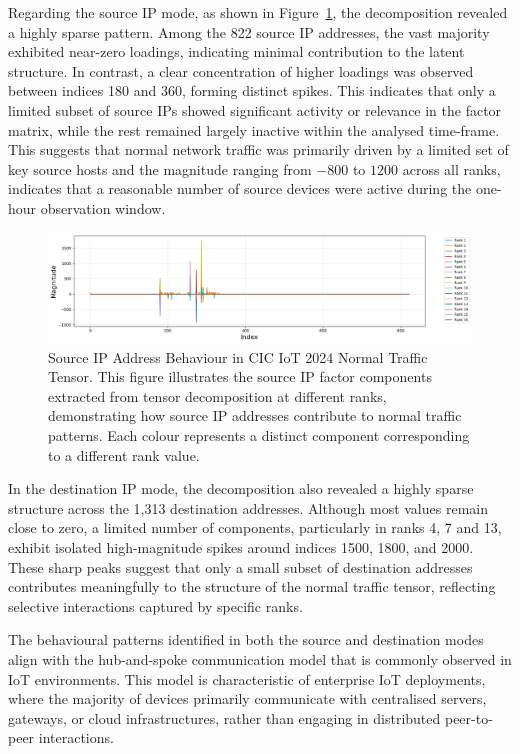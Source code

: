 \documentclass[pdflatex,sn-mathphys-num]{sn-jnl}
\theoremstyle{thmstyleone}
\theoremstyle{thmstyletwo}
\theoremstyle{thmstylethree}
\begin{document}
Regarding the source IP mode, as shown in Figure~\ref{fig:source_IP}, the decomposition revealed a highly sparse pattern. Among the 822 source IP addresses, the vast majority exhibited near-zero loadings, indicating minimal contribution to the latent structure. In contrast, a clear concentration of higher loadings was observed between indices 180 and 360, forming distinct spikes. This indicates that only a limited subset of source IPs showed significant activity or relevance in the factor matrix, while the rest remained largely inactive within the analysed time-frame. This suggests that normal network traffic was primarily driven by a limited set of key source hosts and the magnitude ranging from $-800$ to $1200$ across all ranks, indicates that a reasonable number of source devices were active during the one-hour observation window.


\begin{figure}[H]
    \centering    \includegraphics[width=1.2\linewidth]{Source IP mode.png}
    \caption{Source IP Address Behaviour in CIC IoT 2024 Normal Traffic Tensor.
This figure illustrates the source IP factor components extracted from tensor decomposition at different ranks, demonstrating how source IP addresses contribute to normal traffic patterns. Each colour represents a distinct component corresponding to a different rank value.}
    \label{fig:source_IP}
\end{figure}

In the destination IP mode, the decomposition also revealed a highly sparse structure across the 1,313 destination addresses. Although most values remain close to zero, a limited number of components, particularly in ranks 4, 7 and 13, exhibit isolated high-magnitude spikes around indices 1500, 1800, and 2000. These sharp peaks suggest that only a small subset of destination addresses contributes meaningfully to the structure of the normal traffic tensor, reflecting selective interactions captured by specific ranks.

The behavioural patterns identified in both the source and destination modes align with the hub-and-spoke communication model that is commonly observed in IoT environments. This model is characteristic of enterprise IoT deployments, where the majority of devices primarily communicate with centralised servers, gateways, or cloud infrastructures, rather than engaging in distributed peer-to-peer interactions.
\end{document}
